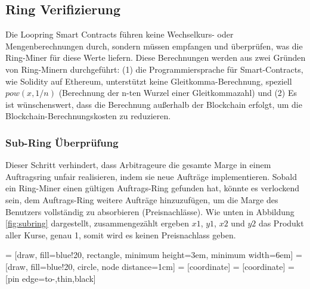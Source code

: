 \documentclass[UTF8,nofonts]{article}
\makeatletter
\newenvironment{figurehere}
 {\def\@captype{figure}}
 {}
\makeatother
\begin{document}
\begin{multicols}{2}
\subsection{Ring Verifizierung\label{sec:ring_verification}}

Die Loopring Smart Contracts führen keine Wechselkurs- oder Mengenberechnungen durch, sondern müssen empfangen und überprüfen, was die Ring-Miner für diese Werte liefern. Diese Berechnungen werden aus zwei Gründen von Ring-Minern durchgeführt: (1) die Programmiersprache für Smart-Contracts, wie Solidity\cite{dannen2017introducing} auf Ethereum, unterstützt keine Gleitkomma-Berechnung, speziell $pow(x, 1/n)$ (Berechnung der n-ten Wurzel einer Gleitkommazahl) und (2) Es ist wünschenswert, dass die Berechnung außerhalb der Blockchain erfolgt, um die Blockchain-Berechnungskosten zu reduzieren.

\subsubsection{Sub-Ring Überprüfung\label{sec:sub_ring_check}}
Dieser Schritt verhindert, dass Arbitrageure die gesamte Marge in einem Auftragsring unfair realisieren, indem sie neue Aufträge implementieren. Sobald ein Ring-Miner einen gültigen Auftrags-Ring gefunden hat, könnte es verlockend sein, dem Auftrags-Ring weitere Aufträge hinzuzufügen, um die Marge des Benutzers vollständig zu absorbieren (Preisnachlässe). Wie unten in Abbildung \ref{fig:subring} dargestellt, zusammengezählt ergeben $x1$, $y1$, $x2$ und $y2$ das Produkt aller Kurse, genau 1, somit wird es keinen Preisnachlass geben.

\begin{center}
\begin{figurehere}
\centering
{} = [draw, fill=blue!20, rectangle, 
    minimum height=3em, minimum width=6em]
 = [draw, fill=blue!20, circle, node distance=1cm]
 = [coordinate]
 = [coordinate]
 = [pin edge={to-,thin,black}]

\end{figurehere}
\end{center}
\end{multicols}
\end{document}
